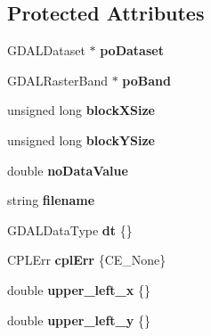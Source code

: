 \subsection*{Protected Attributes}
\begin{DoxyCompactItemize}
\item 
G\+D\+A\+L\+Dataset $\ast$ {\bfseries po\+Dataset}\hypertarget{class_map_ab25f4ed0c6612065dbda19cc1db10b75}{}\label{class_map_ab25f4ed0c6612065dbda19cc1db10b75}

\item 
G\+D\+A\+L\+Raster\+Band $\ast$ {\bfseries po\+Band}\hypertarget{class_map_ac6cbdae357af04320bb5d90aee486e33}{}\label{class_map_ac6cbdae357af04320bb5d90aee486e33}

\item 
unsigned long {\bfseries block\+X\+Size}\hypertarget{class_map_a929de1f15110afceeec89b47da506e67}{}\label{class_map_a929de1f15110afceeec89b47da506e67}

\item 
unsigned long {\bfseries block\+Y\+Size}\hypertarget{class_map_ab02c8f5022c1835c135f202fe9b2eebd}{}\label{class_map_ab02c8f5022c1835c135f202fe9b2eebd}

\item 
double {\bfseries no\+Data\+Value}\hypertarget{class_map_ac7c12737fe97556a4d03487716fa4f45}{}\label{class_map_ac7c12737fe97556a4d03487716fa4f45}

\item 
string {\bfseries filename}\hypertarget{class_map_a193db5e3339832c878c37336d39122e0}{}\label{class_map_a193db5e3339832c878c37336d39122e0}

\item 
G\+D\+A\+L\+Data\+Type {\bfseries dt} \{\}\hypertarget{class_map_a3dc928c65262f0c8f20f0f64e6cde40f}{}\label{class_map_a3dc928c65262f0c8f20f0f64e6cde40f}

\item 
C\+P\+L\+Err {\bfseries cpl\+Err} \{C\+E\+\_\+\+None\}\hypertarget{class_map_a388da4db48d63ab579b600294a600c9d}{}\label{class_map_a388da4db48d63ab579b600294a600c9d}

\item 
double {\bfseries upper\+\_\+left\+\_\+x} \{\}\hypertarget{class_map_ae3b72e22a19277aa531ae90f47c461b2}{}\label{class_map_ae3b72e22a19277aa531ae90f47c461b2}

\item 
double {\bfseries upper\+\_\+left\+\_\+y} \{\}\hypertarget{class_map_a37d531f2f186f90d3f4563e91f2623cb}{}\label{class_map_a37d531f2f186f90d3f4563e91f2623cb}


\end{DoxyCompactItemize}

